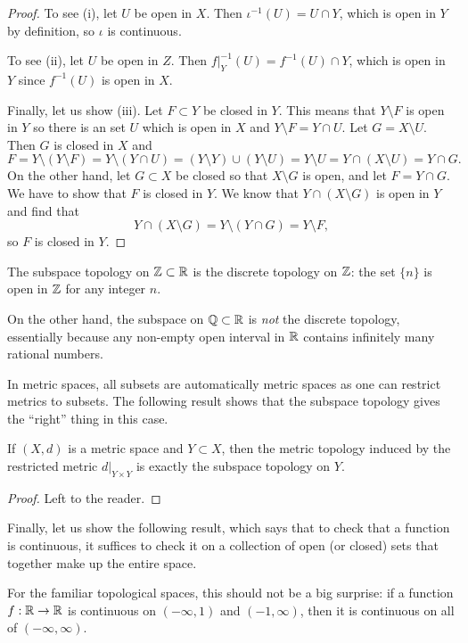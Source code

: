 \begin{proof}
  To see (i), let $U$ be open in $X$. Then $\iota^{-1}(U) = U \cap Y$, which is open in $Y$ by definition, so $\iota$ is continuous.
  
  To see (ii), let $U$ be open in $Z$. Then $f|_Y^{-1}(U) = f^{-1}(U) \cap Y$, which is open in $Y$ since $f^{-1}(U)$ is open in $X$.
  
  Finally, let us show (iii). Let $F \subset Y$ be closed in $Y$. This means that $Y \setminus F$ is open in $Y$ so there is an set $U$ which is open in $X$ and $Y \setminus F = Y \cap U$. Let $G = X \setminus U$. Then $G$ is closed in $X$ and
  \[
    F = Y \setminus (Y \setminus F) = Y \setminus (Y \cap U) = (Y \setminus Y) \cup (Y \setminus U) = Y \setminus U = Y \cap (X \setminus U) = Y \cap G.
  \]
  On the other hand, let $G \subset X$ be closed so that $X \setminus G$ is open, and let $F = Y \cap G$. We have to show that $F$ is closed in $Y$. We know that $Y \cap (X \setminus G)$ is open in $Y$ and find that
  \[
    Y \cap (X \setminus G) = Y \setminus (Y \cap G) = Y \setminus F,
  \]
  so $F$ is closed in $Y$.
\end{proof}
\begin{example}
  The subspace topology on $\mathbb{Z} \subset \mathbb{R}$ is the discrete topology on $\mathbb{Z}$: the set $\{n\}$ is open in $\mathbb{Z}$ for any integer $n$.
  
  On the other hand, the subspace on $\mathbb{Q} \subset \mathbb{R}$ is \emph{not} the discrete topology, essentially because any non-empty open interval in $\mathbb{R}$ contains infinitely many rational numbers.
\end{example}

In metric spaces, all subsets are automatically metric spaces as one can restrict metrics to subsets. The following result shows that the subspace topology gives the ``right'' thing in this case.

\begin{prop}
  If $(X,d)$ is a metric space and $Y \subset X$, then the metric topology induced by the restricted metric $d|_{Y \times Y}$ is exactly the subspace topology on $Y$.
\end{prop}
\begin{proof}
  Left to the reader.
\end{proof}
Finally, let us show the following result, which says that to check that a function is continuous, it suffices to check it on a collection of open (or closed) sets that together make up the entire space.
\begin{example}
  For the familiar topological spaces, this should not be a big surprise: if a function $f : \mathbb{R} \to \mathbb{R}$ is continuous on $(-\infty,1)$ and $(-1,\infty)$, then it is continuous on all of $(-\infty,\infty)$.
\end{example}

